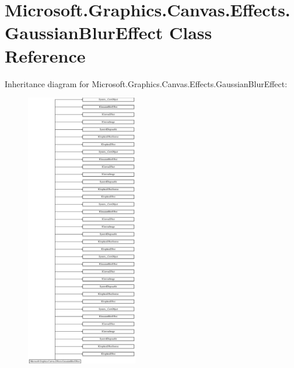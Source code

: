 \hypertarget{class_microsoft_1_1_graphics_1_1_canvas_1_1_effects_1_1_gaussian_blur_effect}{}\section{Microsoft.\+Graphics.\+Canvas.\+Effects.\+Gaussian\+Blur\+Effect Class Reference}
\label{class_microsoft_1_1_graphics_1_1_canvas_1_1_effects_1_1_gaussian_blur_effect}
Inheritance diagram for Microsoft.\+Graphics.\+Canvas.\+Effects.\+Gaussian\+Blur\+Effect\+:\begin{figure}[H]
\begin{center}
\leavevmode
\includegraphics[height=12.000000cm]{class_microsoft_1_1_graphics_1_1_canvas_1_1_effects_1_1_gaussian_blur_effect}
\end{center}
\end{figure}
